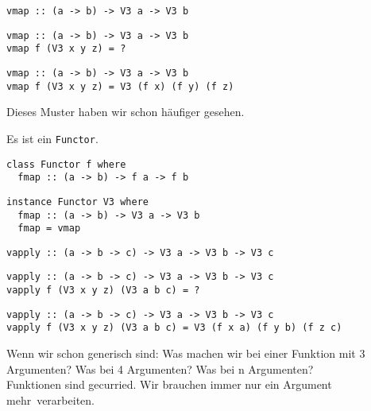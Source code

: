 \documentclass{beamer}
\begin{document}
\begin{frame}[fragile]
\begin{overprint}
\begin{verbatim}
vmap :: (a -> b) -> V3 a -> V3 b
\end{verbatim}
\begin{verbatim}
vmap :: (a -> b) -> V3 a -> V3 b
vmap f (V3 x y z) = ?
\end{verbatim}
\begin{verbatim}
vmap :: (a -> b) -> V3 a -> V3 b
vmap f (V3 x y z) = V3 (f x) (f y) (f z)
\end{verbatim}
\end{overprint}
\pause
\pause
\pause
Dieses Muster haben wir schon häufiger gesehen.\\\par
\pause
Es ist ein \texttt{Functor}.
\begin{verbatim}
class Functor f where
  fmap :: (a -> b) -> f a -> f b
\end{verbatim}
\pause
\begin{verbatim}
instance Functor V3 where
  fmap :: (a -> b) -> V3 a -> V3 b
  fmap = vmap
\end{verbatim}

\end{frame}

\begin{frame}[fragile]
\begin{overprint}
\begin{verbatim}
vapply :: (a -> b -> c) -> V3 a -> V3 b -> V3 c
\end{verbatim}
\begin{verbatim}
vapply :: (a -> b -> c) -> V3 a -> V3 b -> V3 c
vapply f (V3 x y z) (V3 a b c) = ?
\end{verbatim}
\begin{verbatim}
vapply :: (a -> b -> c) -> V3 a -> V3 b -> V3 c
vapply f (V3 x y z) (V3 a b c) = V3 (f x a) (f y b) (f z c)
\end{verbatim}
\end{overprint}
\pause
\pause
\pause
Wenn wir schon generisch sind: Was machen wir bei einer Funktion mit 3 Argumenten? \pause
 Was bei 4 Argumenten? \pause Was bei n Argumenten?\pause \\\bigskip
Funktionen sind gecurried. Wir brauchen immer nur \glqq ein Argument mehr\grqq \ verarbeiten.
\end{frame}
\end{document}
